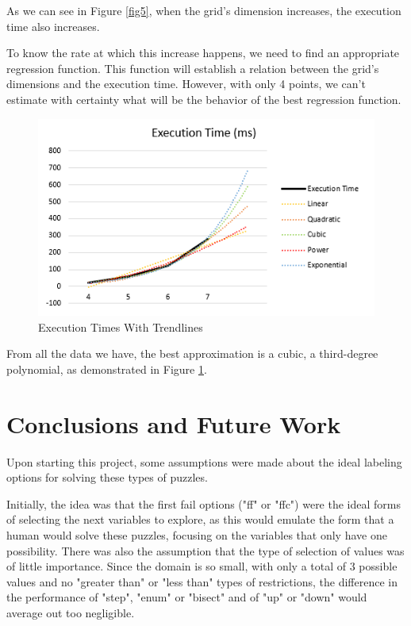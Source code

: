 \documentclass[runningheads]{llncs}
\begin{document}
As we can see in Figure \ref{fig5}, when the grid's dimension increases,
    the execution time also increases.

To know the rate at which this increase happens, we need to find an appropriate regression function.
This function will establish a relation between the grid's dimensions and the execution time.
However, with only 4 points, we can't estimate with certainty what will be the behavior
    of the best regression function.

\begin{figure} [h]
    \centering
    \includegraphics[scale=0.6]{img/dimensional_prediction.png}
    \caption{Execution Times With Trendlines} \label{fig6}
\end{figure}

From all the data we have, the best approximation is a cubic, a third-degree polynomial,
    as demonstrated in Figure \ref{fig6}.

\section{Conclusions and Future Work}

Upon starting this project, some assumptions were made about the ideal labeling options
    for solving these types of puzzles.

Initially, the idea was that the first fail options ("ff" or "ffc") were the ideal forms of
    selecting the next variables to explore, as this would emulate the form that a human would
    solve these puzzles, focusing on the variables that only have one possibility.
There was also the assumption that the type of selection of values was of little importance.
Since the domain is so small, with only a total of 3 possible values and no "greater than" or
    "less than" types of restrictions, the difference in the performance of "step", "enum" or
    "bisect" and of "up" or "down" would average out too negligible.
\end{document}
